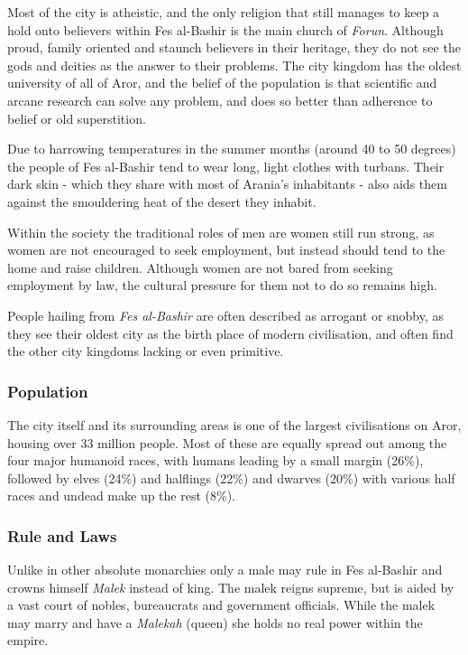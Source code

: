 Most of the city is atheistic, and the only religion that still manages to
keep a hold onto believers within Fes al-Bashir is the main church of
\emph{Forun}. Although proud, family oriented and staunch believers in their
heritage, they do not see the gods and deities as the answer to their
problems. The city kingdom has the oldest university of all of Aror, and the
belief of the population is that scientific and arcane research can solve any
problem, and does so better than adherence to belief or old superstition.

Due to harrowing temperatures in the summer months (around 40 to 50 degrees)
the people of Fes al-Bashir tend to wear long, light clothes with
turbans. Their dark skin - which they share with most of Arania's inhabitants
- also aids them against the smouldering heat of the desert they inhabit.

Within the society the traditional roles of men are women still run strong, as
women are not encouraged to seek employment, but instead should tend to the
home and raise children. Although women are not bared from seeking employment
by law, the cultural pressure for them not to do so remains high.

People hailing from \emph{Fes al-Bashir} are often described as arrogant or
snobby, as they see their oldest city as the birth place of modern
civilisation, and often find the other city kingdoms lacking or even
primitive.

\subsubsection{Population}

The city itself and its surrounding areas is one of the largest civilisations
on Aror, housing over 33 million people. Most of these are equally spread out
among the four major humanoid races, with humans leading by a small margin
(26\%), followed by elves (24\%) and halflings (22\%) and dwarves (20\%) with
various half races and undead make up the rest (8\%).

\subsubsection{Rule and Laws}

Unlike in other absolute monarchies only a male may rule in Fes al-Bashir and
crowns himself \emph{Malek} instead of king. The malek reigns supreme, but is
aided by a vast court of nobles, bureaucrats and government officials. While
the malek may marry and have a \emph{Malekah} (queen) she holds no real power
within the empire.

